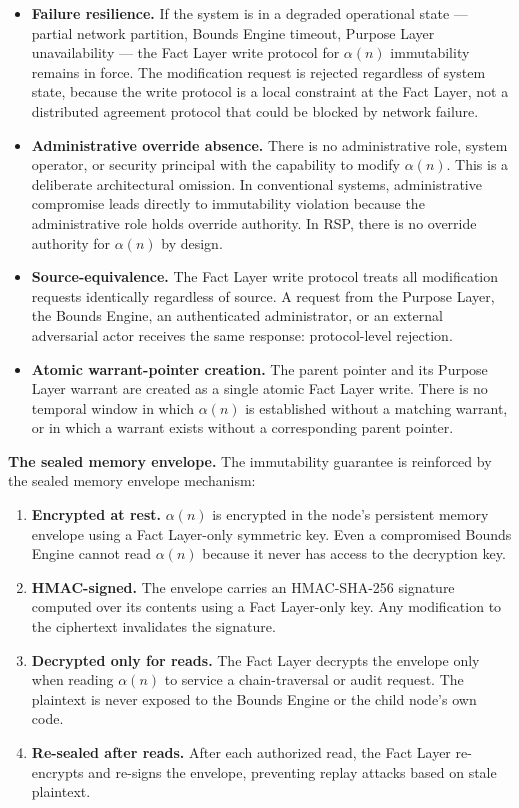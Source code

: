 \begin{itemize}
    \item \textbf{Failure resilience.} If the system is in a degraded operational state — partial network partition, Bounds Engine timeout, Purpose Layer unavailability — the Fact Layer write protocol for $\alpha(n)$ immutability remains in force. The modification request is rejected regardless of system state, because the write protocol is a local constraint at the Fact Layer, not a distributed agreement protocol that could be blocked by network failure.
    \item \textbf{Administrative override absence.} There is no administrative role, system operator, or security principal with the capability to modify $\alpha(n)$. This is a deliberate architectural omission. In conventional systems, administrative compromise leads directly to immutability violation because the administrative role holds override authority. In RSP, there is no override authority for $\alpha(n)$ by design.
    \item \textbf{Source-equivalence.} The Fact Layer write protocol treats all modification requests identically regardless of source. A request from the Purpose Layer, the Bounds Engine, an authenticated administrator, or an external adversarial actor receives the same response: protocol-level rejection.
    \item \textbf{Atomic warrant-pointer creation.} The parent pointer and its Purpose Layer warrant are created as a single atomic Fact Layer write. There is no temporal window in which $\alpha(n)$ is established without a matching warrant, or in which a warrant exists without a corresponding parent pointer.
\end{itemize}

\medskip
\noindent\textbf{The sealed memory envelope.} The immutability guarantee is reinforced by the sealed memory envelope mechanism:

\begin{enumerate}
    \item \textbf{Encrypted at rest.} $\alpha(n)$ is encrypted in the node's persistent memory envelope using a Fact Layer-only symmetric key. Even a compromised Bounds Engine cannot read $\alpha(n)$ because it never has access to the decryption key.
    \item \textbf{HMAC-signed.} The envelope carries an HMAC-SHA-256 signature computed over its contents using a Fact Layer-only key. Any modification to the ciphertext invalidates the signature.
    \item \textbf{Decrypted only for reads.} The Fact Layer decrypts the envelope only when reading $\alpha(n)$ to service a chain-traversal or audit request. The plaintext is never exposed to the Bounds Engine or the child node's own code.
    \item \textbf{Re-sealed after reads.} After each authorized read, the Fact Layer re-encrypts and re-signs the envelope, preventing replay attacks based on stale plaintext.
\end{enumerate}

